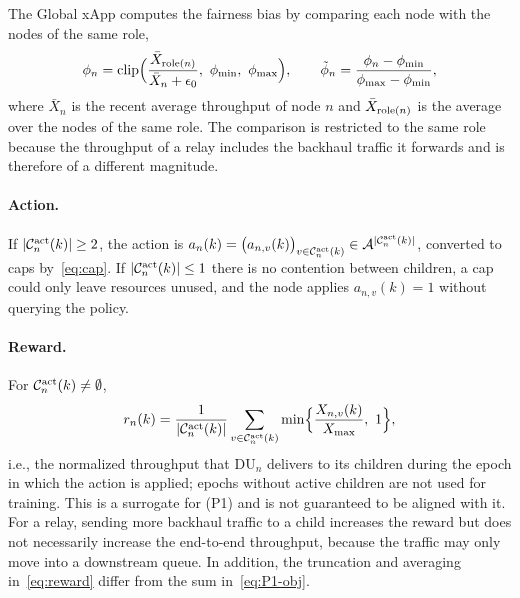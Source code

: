 \begin{EnChapter}
The Global xApp computes the fairness bias by comparing each node with the nodes of
the same role,
\begin{equation}
  \phi_n = \clip\Bigl( \frac{\bar X_{\role(n)}}{\bar X_n + \epsilon_0},\ \phi_{\min},\ \phi_{\max} \Bigr), \qquad
  \tilde\phi_n = \frac{\phi_n - \phi_{\min}}{\phi_{\max} - \phi_{\min}},
  \label{eq:fairness-bias}
\end{equation}
where $\bar X_n$ is the recent average throughput of node $n$ and
$\bar X_{\operatorname{role}(n)}$ is the average over the nodes of the same role. The comparison is
restricted to the same role because the throughput of a relay includes the backhaul
traffic it forwards and is therefore of a different magnitude.

\paragraph{Action.}
If $|\mathcal{C}_n^{\mathrm{act}}(k)| \ge 2$, the action is
$a_n(k) = \bigl( a_{n,v}(k) \bigr)_{v \in \mathcal{C}_n^{\mathrm{act}}(k)} \in \mathcal{A}^{|\mathcal{C}_n^{\mathrm{act}}(k)|}$,
converted to caps by~\eqref{eq:cap}. If $|\mathcal{C}_n^{\mathrm{act}}(k)| \le 1$ there is no
contention between children, a cap could only leave resources unused, and the node
applies $a_{n,v}(k) = 1$ without querying the policy.

\paragraph{Reward.}
For $\mathcal{C}_n^{\mathrm{act}}(k) \neq \emptyset$,
\begin{equation}
  r_n(k) = \frac{1}{|\mathcal{C}_n^{\mathrm{act}}(k)|} \sum_{v \in \mathcal{C}_n^{\mathrm{act}}(k)} \min\Bigl\{ \frac{X_{n,v}(k)}{X_{\max}},\ 1 \Bigr\},
  \label{eq:reward}
\end{equation}
i.e., the normalized throughput that DU$_n$ delivers to its children during the
epoch in which the action is applied; epochs without active children are not used
for training. This is a surrogate for (P1) and is not guaranteed to be aligned with
it. For a relay, sending more backhaul traffic to a child increases the reward but
does not necessarily increase the end-to-end throughput, because the traffic may
only move into a downstream queue. In addition,
the truncation and averaging in~\eqref{eq:reward} differ from the sum
in~\eqref{eq:P1-obj}.


\end{EnChapter}
